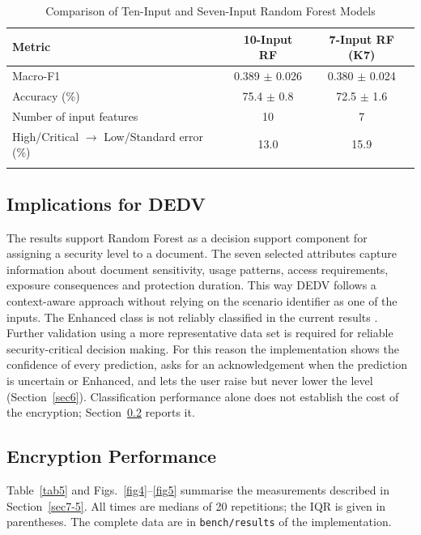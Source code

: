 \documentclass[pdflatex,sn-mathphys-num]{sn-jnl}
\newcommand{\code}[1]{\texttt{#1}}
\begin{document}
\begin{table}[h]
\caption{Comparison of Ten-Input and Seven-Input Random Forest Models}\label{tab3}
\begin{tabular}{@{}lcc@{}}
\toprule
Metric & 10-Input RF & 7-Input RF (K7) \\
\midrule
Macro-F1 & 0.389 $\pm$ 0.026 & 0.380 $\pm$ 0.024 \\
Accuracy (\%) & 75.4 $\pm$ 0.8 & 72.5 $\pm$ 1.6 \\
Number of input features & 10 & 7 \\
High/Critical $\rightarrow$ Low/Standard error (\%) & 13.0 & 15.9 \\
\botrule
\end{tabular}
\end{table}

\subsection{Implications for DEDV}

The results support Random Forest as a decision support component for assigning a security level
to a document. The seven selected attributes capture information about document sensitivity, usage
patterns, access requirements, exposure consequences and protection duration. This way DEDV
follows a context-aware approach without relying on the scenario identifier as one of the inputs.
The Enhanced class is not reliably classified in the current results \cite{park2022majority}.
Further validation using a more representative data set is required for reliable security-critical
decision making. For this reason the implementation shows the confidence of every prediction, asks
for an acknowledgement when the prediction is uncertain or Enhanced, and lets the user raise but
never lower the level (Section~\ref{sec6}). Classification performance alone does not establish
the cost of the encryption; Section~\ref{sec8-3} reports it.

\subsection{Encryption Performance}\label{sec8-3}

Table~\ref{tab5} and Figs.~\ref{fig4}--\ref{fig5} summarise the measurements described in
Section~\ref{sec7-5}. All times are medians of 20 repetitions; the IQR is given in parentheses. The
complete data are in \code{bench/results} of the implementation.
\end{document}
